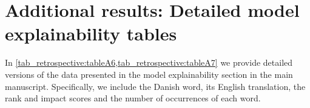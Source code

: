 {\begin{table}[h]
{\begin{tabular}{l|ccccc}


        \bottomrule
    \end{tabular}%
    }
\end{table}


\section{Additional results: Detailed model explainability tables}

In \cref{tab_retrospective:tableA6,tab_retrospective:tableA7} we provide detailed versions of the data presented in the model explainability section in the main manuscript. Specifically, we include the Danish word, its English translation, the rank and impact scores and the number of occurrences of each word.


}
